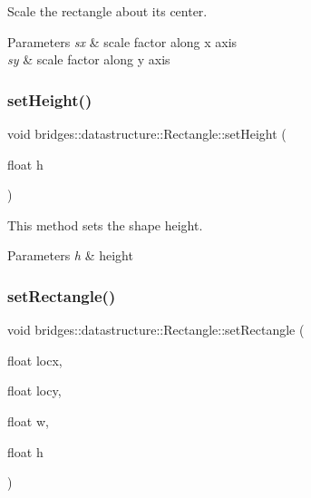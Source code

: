 Scale the rectangle about its center. 


\begin{DoxyParams}{Parameters}
{\em sx} & scale factor along x axis \\
\hline
{\em sy} & scale factor along y axis \\
\hline
\end{DoxyParams}
\mbox{\label{classbridges_1_1datastructure_1_1_rectangle_a6a3e99759282dd822c5615d1643f2a81}} 
\subsubsection{\texorpdfstring{set\+Height()}{setHeight()}}
{\footnotesize\ttfamily void bridges\+::datastructure\+::\+Rectangle\+::set\+Height (\begin{DoxyParamCaption}\item[{float}]{h }\end{DoxyParamCaption})\hspace{0.3cm}{\ttfamily [inline]}}



This method sets the shape height. 


\begin{DoxyParams}{Parameters}
{\em h} & height \\
\hline
\end{DoxyParams}
\mbox{\label{classbridges_1_1datastructure_1_1_rectangle_a01e49a75f3826ea63e581d3669e3626b}} 
\subsubsection{\texorpdfstring{set\+Rectangle()}{setRectangle()}}
{\footnotesize\ttfamily void bridges\+::datastructure\+::\+Rectangle\+::set\+Rectangle (\begin{DoxyParamCaption}\item[{float}]{locx,  }\item[{float}]{locy,  }\item[{float}]{w,  }\item[{float}]{h }\end{DoxyParamCaption})\hspace{0.3cm}{\ttfamily [inline]}}

